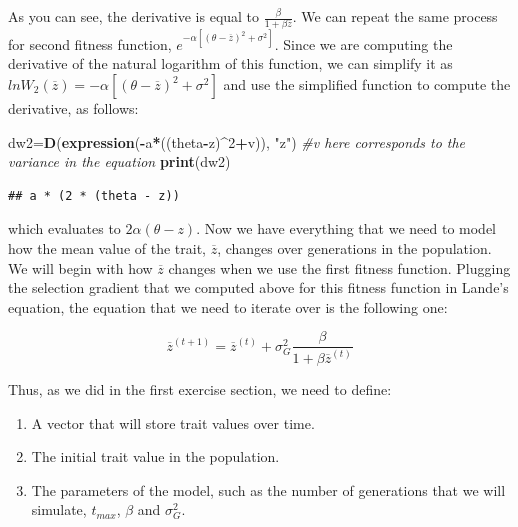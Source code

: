 \documentclass[
]{book}
\newenvironment{Shaded}{\begin{snugshade}}{\end{snugshade}}
\newcommand{\CommentTok}[1]{\textcolor[rgb]{0.56,0.35,0.01}{\textit{#1}}}
\newcommand{\DecValTok}[1]{\textcolor[rgb]{0.00,0.00,0.81}{#1}}
\newcommand{\FunctionTok}[1]{\textcolor[rgb]{0.13,0.29,0.53}{\textbf{#1}}}
\newcommand{\NormalTok}[1]{#1}
\newcommand{\OtherTok}[1]{\textcolor[rgb]{0.56,0.35,0.01}{#1}}
\newcommand{\SpecialCharTok}[1]{\textcolor[rgb]{0.81,0.36,0.00}{\textbf{#1}}}
\newcommand{\StringTok}[1]{\textcolor[rgb]{0.31,0.60,0.02}{#1}}
\providecommand{\tightlist}{%
  \setlength{\itemsep}{0pt}\setlength{\parskip}{0pt}}
\begin{document}
As you can see, the derivative is equal to \(\frac{\beta}{1+\beta \overline{z}}\). We can repeat the same process for second fitness function, \(e^{-\alpha\left[\left(\theta-\overline{z}\right)^2 + \sigma^2\right]}\). Since we are computing the derivative of the natural logarithm of this function, we can simplify it as \(lnW_{2}(\overline{z})=-\alpha\left[\left(\theta-\overline{z}\right)^2 + \sigma^2\right]\) and use the simplified function to compute the derivative, as follows:

\begin{Shaded}
\begin{Highlighting}[]
\NormalTok{dw2}\OtherTok{=}\FunctionTok{D}\NormalTok{(}\FunctionTok{expression}\NormalTok{(}\SpecialCharTok{{-}}\NormalTok{a}\SpecialCharTok{*}\NormalTok{((theta}\SpecialCharTok{{-}}\NormalTok{z)}\SpecialCharTok{\^{}}\DecValTok{2}\SpecialCharTok{+}\NormalTok{v)), }\StringTok{"z"}\NormalTok{) }\CommentTok{\#v here corresponds to the variance in the equation}
\FunctionTok{print}\NormalTok{(dw2)}
\end{Highlighting}
\end{Shaded}

\begin{verbatim}
## a * (2 * (theta - z))
\end{verbatim}

which evaluates to \(2\alpha (\theta-z)\). Now we have everything that we need to model how the mean value of the trait, \(\overline{z}\), changes over generations in the population. We will begin with how \(\overline{z}\) changes when we use the first fitness function. Plugging the selection gradient that we computed above for this fitness function in Lande's equation, the equation that we need to iterate over is the following one:

\[
\overline{z}^{(t+1)}=\overline{z}^{(t)}+\sigma^{2}_{G}\frac{\beta}{1+\beta \overline{z}^{(t)}}
\]

Thus, as we did in the first exercise section, we need to define:

\begin{enumerate}
\def\labelenumi{\arabic{enumi}.}
\tightlist
\item
  A vector that will store trait values over time.
\item
  The initial trait value in the population.
\item
  The parameters of the model, such as the number of generations that we will simulate, \(t_{max}\), \(\beta\) and \(\sigma^{2}_{G}\).
\end{enumerate}
\end{document}
